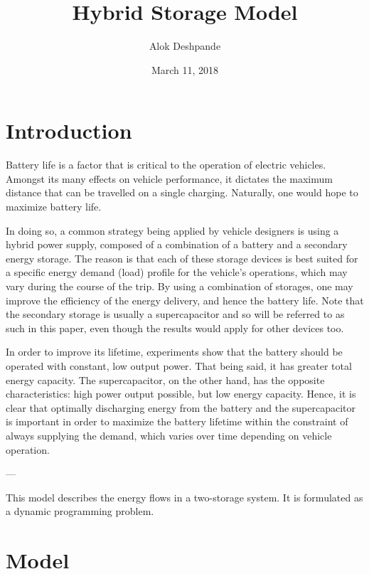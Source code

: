 \documentclass{article}
\title{Hybrid Storage Model}
\author{Alok Deshpande}
\date{March 11, 2018}
\begin{document}
	
	\maketitle
	
	\section{Introduction}
	Battery life is a factor that is critical to the operation of electric vehicles. Amongst its many effects on vehicle performance, it dictates the maximum distance that can be travelled on a single charging. Naturally, one would hope to maximize battery life.
	
	In doing so, a common strategy being applied by vehicle designers is using a hybrid power supply, composed of a combination of a battery and a secondary energy storage. \cite{thounthong2009energy} The reason is that each of these storage devices is best suited for a specific energy demand (load) profile for the vehicle's operations, which may vary during the course of the trip. By using a combination of storages, one may improve the efficiency of the energy delivery, and hence the battery life. Note that the secondary storage is usually a supercapacitor and so will be referred to as such in this paper, even though the results would apply for other devices too.
	
	In order to improve its lifetime, experiments show that the battery should be operated with constant, low output power. That being said, it has greater total energy capacity. The supercapacitor, on the other hand, has the opposite characteristics: high power output possible, but low energy capacity. Hence, it is clear that optimally discharging energy from the battery and the supercapacitor is important in order to maximize the battery lifetime within the constraint of always supplying the demand, which varies over time depending on vehicle operation.
	
	---
	
	This model describes the energy flows in a two-storage system. It is formulated as a dynamic programming problem.
	
	\section{Model}
	
\end{document}
